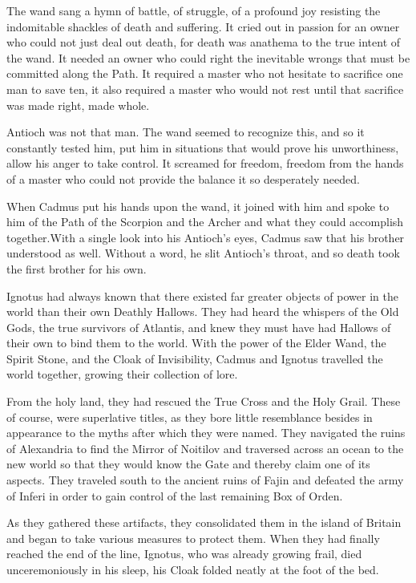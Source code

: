 The wand sang a hymn of battle, of struggle, of a profound joy resisting the indomitable shackles of death and suffering. It cried out in passion for an owner who could not just deal out death, for death was anathema to the true intent of the wand. It needed an owner who could right the inevitable wrongs that must be committed along the Path. It required a master who not hesitate to sacrifice one man to save ten, it also required a master who would not rest until that sacrifice was made right, made whole.

Antioch was not that man. The wand seemed to recognize this, and so it constantly tested him, put him in situations that would prove his unworthiness, allow his anger to take control. It screamed for freedom, freedom from the hands of a master who could not provide the balance it so desperately needed.

When Cadmus put his hands upon the wand, it joined with him and spoke to him of the Path of the Scorpion and the Archer and what they could accomplish together.With a single look into his Antioch’s eyes, Cadmus saw that his brother understood as well. Without a word, he slit Antioch’s throat, and so death took the first brother for his own.

Ignotus had always known that there existed far greater objects of power in the world than their own Deathly Hallows. They had heard the whispers of the Old Gods, the true survivors of Atlantis, and knew they must have had Hallows of their own to bind them to the world. With the power of the Elder Wand, the Spirit Stone, and the Cloak of Invisibility, Cadmus and Ignotus travelled the world together, growing their collection of lore.

From the holy land, they had rescued the True Cross and the Holy Grail. These of course, were superlative titles, as they bore little resemblance besides in appearance to the myths after which they were named. They navigated the ruins of Alexandria to find the Mirror of Noitilov and traversed across an ocean to the new world so that they would know the Gate and thereby claim one of its aspects. They traveled south to the ancient ruins of Fajin and defeated the army of Inferi in order to gain control of the last remaining Box of Orden.

As they gathered these artifacts, they consolidated them in the island of Britain and began to take various measures to protect them. When they had finally reached the end of the line, Ignotus, who was already growing frail, died unceremoniously in his sleep, his Cloak folded neatly at the foot of the bed.

